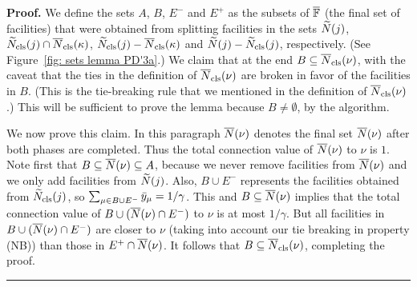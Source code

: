 \documentclass[oneside,final]{ucr}
\newenvironment{proof}[1][Proof]{\textbf{#1.} }{\ \rule{0.5em}{0.5em}}
\begin{document}
\begin{proof}
  We define the sets $A$, $B$, $E^-$ and $E^+$ as the subsets of
  $\overline{\mathbb{F}}$ (the final set of facilities) that were obtained from
  splitting facilities in the sets ${\widetilde N}(j)$, ${\widetilde N}_{{\mbox{\scriptsize\rm cls}}}(j)\cap
  {\overline{N}}_{{\mbox{\scriptsize\rm cls}}}(\kappa)$, ${\widetilde N}_{{\mbox{\scriptsize\rm cls}}}(j) - {\overline{N}}_{{\mbox{\scriptsize\rm cls}}}(\kappa)$ and
  ${\widetilde N}(j) - {\widetilde N}_{{\mbox{\scriptsize\rm cls}}}(j)$, respectively.  (See
  Figure~\ref{fig: sets lemma PD'3a}.)  We claim that at the end
  $B\subseteq {\overline{N}}_{{\mbox{\scriptsize\rm cls}}}(\nu)$, with the caveat that the ties in the
  definition of ${\overline{N}}_{{\mbox{\scriptsize\rm cls}}}(\nu)$ are broken in favor of the
  facilities in $B$.  (This is the tie-breaking rule that we mentioned
  in the definition of ${\overline{N}}_{{\mbox{\scriptsize\rm cls}}}(\nu)$.)  This will be sufficient to
  prove the lemma because $B\neq\emptyset$, by the algorithm.

  We now prove this claim. In this paragraph ${\overline{N}}(\nu)$ denotes the
  final set ${\overline{N}}(\nu)$ after both phases are completed. Thus the total
connection value of ${\overline{N}}(\nu)$ to $\nu$ is $1$.
	Note first that
  $B\subseteq {\overline{N}}(\nu) \subseteq A$, because we never remove
  facilities from ${\overline{N}}(\nu)$ and we only add facilities from
  ${\widetilde N}(j)$.  Also, $B\cup E^-$ represents the facilities obtained
  from ${\widetilde N}_{{\mbox{\scriptsize\rm cls}}}(j)$, so $\sum_{\mu\in B\cup E^-} {\bar y}_{\mu} =
  1/\gamma$.  This and $B\subseteq {\overline{N}}(\nu)$ implies that the total
  connection value of $B\cup ({\overline{N}}(\nu)\cap E^-)$ to $\nu$ is at
  most $1/\gamma$. But all facilities in $B\cup ({\overline{N}}(\nu)\cap E^-)$
  are closer to $\nu$ (taking into account our tie breaking in property (NB))
 	than those in $E^+\cap {\overline{N}}(\nu)$. It follows
  that $B\subseteq {\overline{N}}_{{\mbox{\scriptsize\rm cls}}}(\nu)$, completing the proof.
\end{proof}

\end{document}
